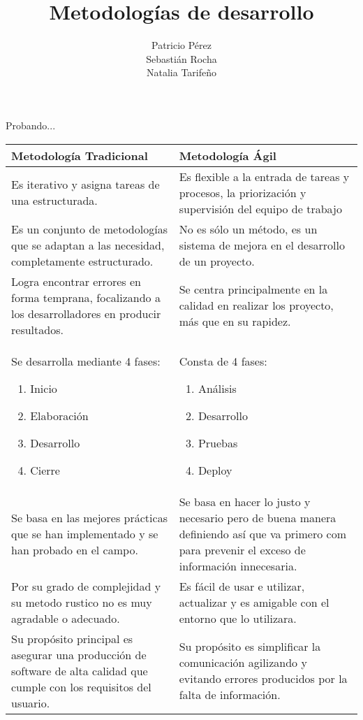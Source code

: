 \documentclass[a4paper,11pt]{report}
\begin{document}
\title{Metodologías de desarrollo}
\author{Patricio Pérez\\
        Sebastián Rocha\\
        Natalia Tarifeño}
\maketitle
\tableofcontents
Probando...
\begin{center}
    \begin{tabular}{ | p{7cm} | p{7cm} |}
    \hline
    Metodología Tradicional & Metodología Ágil \\ \hline
    Es iterativo y asigna tareas de una estructurada. & Es flexible a la entrada de tareas y procesos, la priorización y supervisión del equipo de trabajo \\ \hline
    Es un conjunto de metodologías que se adaptan a las necesidad, completamente estructurado. & No es sólo un método, es un sistema de mejora en el desarrollo de un proyecto. \\ \hline
    Logra encontrar errores en forma temprana, focalizando a los desarrolladores en producir resultados. & Se centra principalmente en la calidad en realizar los proyecto, más que en su rapidez. \\ \hline
    Se desarrolla mediante 4 fases:
    \begin{enumerate}
        \item Inicio
        \item Elaboración
        \item Desarrollo
        \item Cierre
    \end{enumerate} & Consta de 4 fases:
    \begin{enumerate}
        \item Análisis
        \item Desarrollo
        \item Pruebas
        \item Deploy
    \end{enumerate} \\ \hline
    Se basa en las mejores prácticas que se han implementado y se han probado en el campo. & Se basa en hacer lo justo y necesario pero de buena manera definiendo así que va primero com para prevenir el exceso de información innecesaria. \\ \hline
    Por su grado de complejidad y su metodo rustico no es muy agradable o adecuado. & Es fácil de usar e utilizar, actualizar y es amigable con el entorno que lo utilizara. \\ \hline
    Su propósito principal es asegurar una producción de software de alta calidad que cumple con los requisitos del usuario. & Su propósito es simplificar la comunicación agilizando y evitando errores producidos por la falta de información. \\
    \hline
    \end{tabular}
\end{center}
\end{document}
